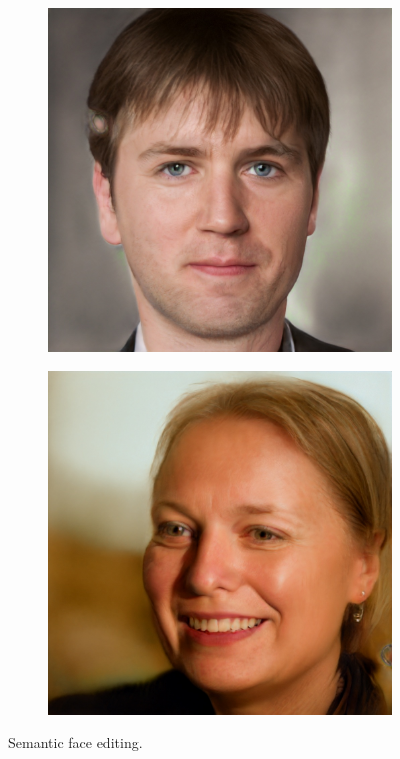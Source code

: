\begin{figure}
\begin{subfigure}[b]{0.24\textwidth}
    \end{subfigure}
    \begin{subfigure}[b]{0.24\textwidth}
        \includegraphics[width=\textwidth]{fig/stylegan/faceedit/mette-gender}
    \end{subfigure}
    \begin{subfigure}[b]{0.24\textwidth}
        \includegraphics[width=\textwidth]{fig/stylegan/faceedit/uffe-gender}
    \end{subfigure}
    \caption{Semantic face editing.}
    \label{faceedit}
\end{figure}
